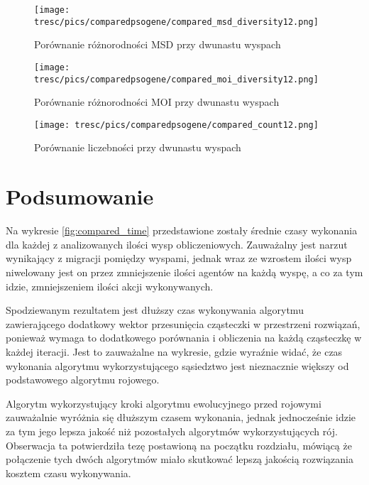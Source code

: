 \begin{figure}[H]
\begin{center} 
\texttt{[image: tresc/pics/comparedpsogene/compared\_msd\_diversity12.png]}
\caption{Porównanie różnorodności MSD przy dwunastu wyspach}
\label{fig:compared_msd_diversity12}
\end{center}
\end{figure}

\begin{figure}[H]
\begin{center} 
\texttt{[image: tresc/pics/comparedpsogene/compared\_moi\_diversity12.png]}
\caption{Porównanie różnorodności MOI przy dwunastu wyspach}
\label{fig:compared_moi_diversity12}
\end{center}
\end{figure}

\begin{figure}[H]
\begin{center} 
\texttt{[image: tresc/pics/comparedpsogene/compared\_count12.png]}
\caption{Porównanie liczebności przy dwunastu wyspach}
\label{fig:compared_count12}
\end{center}
\end{figure}



\section{Podsumowanie}

Na wykresie \ref{fig:compared_time} przedstawione zostały średnie czasy wykonania dla każdej z analizowanych ilości wysp obliczeniowych.  Zauważalny jest narzut wynikający z migracji pomiędzy wyspami, jednak wraz ze wzrostem ilości wysp niwelowany jest on przez zmniejszenie ilości agentów na każdą wyspę, a co za tym idzie, zmniejszeniem ilości akcji wykonywanych.

Spodziewanym rezultatem jest dłuższy czas wykonywania algorytmu zawierającego dodatkowy wektor przesunięcia cząsteczki w przestrzeni rozwiązań, ponieważ wymaga to dodatkowego porównania i obliczenia na każdą cząsteczkę w każdej iteracji. Jest to zauważalne na wykresie, gdzie wyraźnie widać, że czas wykonania algorytmu wykorzystującego sąsiedztwo jest nieznacznie większy od podstawowego algorytmu rojowego.

Algorytm wykorzystujący kroki algorytmu ewolucyjnego przed rojowymi zauważalnie wyróżnia się dłuższym czasem wykonania, jednak jednocześnie idzie za tym jego lepsza jakość niż pozostałych algorytmów wykorzystujących rój. Obserwacja ta potwierdziła tezę postawioną na początku rozdziału, mówiącą że połączenie tych dwóch algorytmów miało skutkować lepszą jakością rozwiązania kosztem czasu wykonywania.

